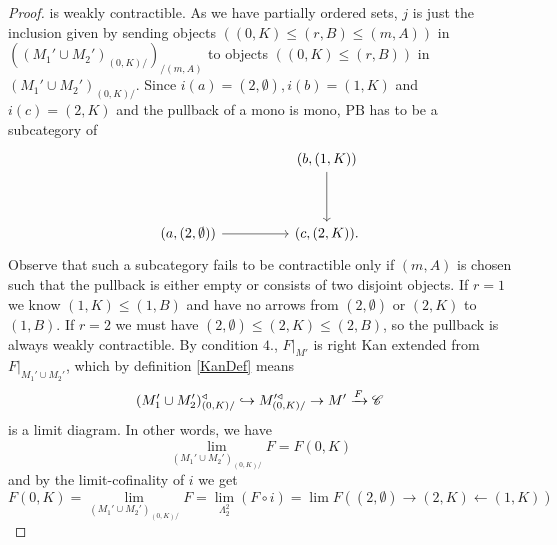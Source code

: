 \documentclass[../../thesis.tex]{subfiles}
\begin{document}
\begin{proof}
    is weakly contractible.
    As we have partially ordered sets,
    $j$ is just the inclusion given by sending objects $((0,K) \leq (r, B) \leq (m,A))$ in $\left((M_1' \cup M_2')_{(0,K)/}\right)_{/(m,A)}$ to objects $((0,K) \leq (r,B))$ in ${(M_1'\cup M_2')_{(0,K)/}}$.
    Since $i(a)=(2,\emptyset), i(b)=(1,K)$ and $i(c)=(2,K)$ and the pullback of a mono is mono, $\mathrm{PB}$ has to be a subcategory of
    \[\begin{tikzcd}
            && {(b,(1,K))} \\
            \\
            {(a,(2,\emptyset))} && {(c,(2,K))}
            \arrow[from=3-1, to=3-3]
            \arrow[from=1-3, to=3-3].
        \end{tikzcd}\]
    Observe that such a subcategory fails to be contractible only if $(m,A)$ is chosen such that the pullback is either empty or consists of two disjoint objects.
    If $r=1$ we know $(1,K) \leq (1,B)$ and have no arrows from $(2,\emptyset)$ or $(2,K)$ to $(1,B)$.
    If $r=2$ we must have $(2,\emptyset) \leq (2,K) \leq (2,B)$, so the pullback is always weakly contractible.
    By condition $4.$, $F|_{M'}$ is right Kan extended from $F|_{M_1' \cup M_2'}$, which by definition \ref{KanDef} means
    \[
        (M_1' \cup M_2')^{\triangleleft}_{(0,K)/} \hookrightarrow M'^{\triangleleft}_{(0,K)/}\rightarrow M' \xrightarrow{F} \mathscr{C}
    \]
    is a limit diagram.
    In other words, we have
    \[
        \lim_{(M_1' \cup M_2')_{(0,K)/}}F = F(0,K)
    \]
    and by the limit-cofinality of $i$ we get
    \[
        F(0,K) = \lim_{(M_1' \cup M_2')_{(0,K)/}}F = \lim_{\Lambda_2^2}(F\circ i) = \lim F((2,\emptyset) \rightarrow (2,K) \leftarrow (1,K))
    \]


\end{proof}
\end{document}

